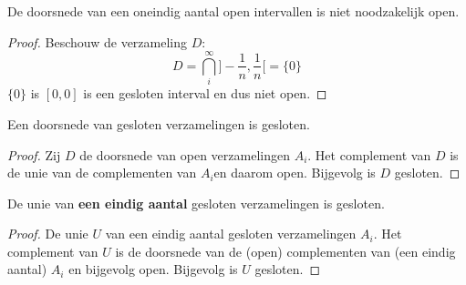 \documentclass[main.tex]{subfiles}
\begin{document}
\begin{tvb}
  De doorsnede van een oneindig aantal open intervallen is niet noodzakelijk open.

  \begin{proof}
    Beschouw de verzameling $D$:
    \[ D = \bigcap_{i}^{\infty}]-\frac{1}{n},\frac{1}{n}[ = \{ 0 \} \]
    $\{ 0 \}$ is $[0,0]$ is een gesloten interval en dus niet open.\needed
  \end{proof}
\end{tvb}

\begin{pr}
  \label{pr:doorsnede-gesloten-verzamelingen-gesloten}
  Een doorsnede van gesloten verzamelingen is gesloten.

  \begin{proof}
    Zij $D$ de doorsnede van open verzamelingen $A_{i}$.
    Het complement van $D$ is de unie van de complementen van $A_{i}$\needed en daarom open.
    Bijgevolg is $D$ gesloten.
  \end{proof}
\end{pr}

\begin{pr}
  \label{pr:eindige-unie-gesloten-verzamelingen-gesloten}
  De unie van \textbf{een eindig aantal} gesloten verzamelingen is gesloten.

  \begin{proof}
    De unie $U$ van een eindig aantal gesloten verzamelingen $A_{i}$.
    Het complement van $U$ is de doorsnede van de (open) complementen van (een eindig aantal) $A_{i}$ en bijgevolg open.
    Bijgevolg is $U$ gesloten.
  \end{proof}
\end{pr}
\end{document}
